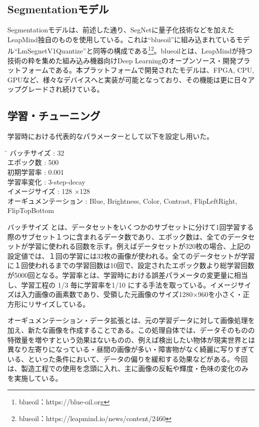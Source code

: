 \subsection{Segmentationモデル}
Segmentationモデルは、前述した通り、SegNetに量子化技術などを加えたLeapMind独自のものを使用している。これは“blueoil”に組み込まれているモデル“LmSegnetV1Quantize”と同等の構成である\footnote{blueoil：https:\slash\slash blue-oil.org}\footnote{blueoil：https:\slash\slash leapmind.io\slash news\slash content\slash 2460}。blueoilとは、LeapMindが持つ技術の粋を集めた組み込み機器向けDeep Learningのオープンソース・開発プラットフォームである。本プラットフォームで開発されたモデルは、FPGA, CPU, GPUなど、様々なデバイスへと実装が可能となっており、その機能は更に日々アップグレードされ続けている。

\subsection{学習・チューニング}
学習時における代表的なパラメーターとして以下を設定し用いた。

\begin{tabbing}
\hspace{40mm}\= \hspace{10mm} \kill
バッチサイズ \>: 32\\
エポック数 \>: 500\\
初期学習率 \>: 0.001\\
学習率変化 \>: 3-step-decay \\
イメージサイズ \>: 128 ×128\\
オーギュメンテーション \>: Blue, Brightness, Color, Contrast, FlipLeftRight, FlipTopBottom\\
\end{tabbing}

バッチサイズ とは、データセットをいくつかのサブセットに分けて1回学習する際のサブセット１つに含まれるデータ数であり、エポック数は、全てのデータセットが学習に使われる回数を示す。例えばデータセットが320枚の場合、上記の設定値では、１回の学習には32枚の画像が使われる。全てのデータセットが学習に１回使われるまでの学習回数は10回で、設定されたエポック数より総学習回数が5000回となる。学習率とは、学習時における誤差パラメータの変更量に相当し、学習工程の 1/3 毎に学習率を1/10 にする手法を取っている。イメージサイズは入力画像の画素数であり、受領した元画像のサイズ1280×960を小さく・正方形にリサイズしている。

オーギュメンテーション・データ拡張とは、元の学習データに対して画像処理を加え、新たな画像を作成することである。この処理自体では、データそのものの特徴量を増やすという効果はないものの、例えば検出したい物体が現実世界とは異なり左寄りになっている・昼間の画像が多い・障害物がなく綺麗に写りすぎている、といった条件において、データの偏りを緩和する効果などがある。今回は、製造工程での使用を念頭に入れ、主に画像の反転や輝度・色味の変化のみを実施している。

